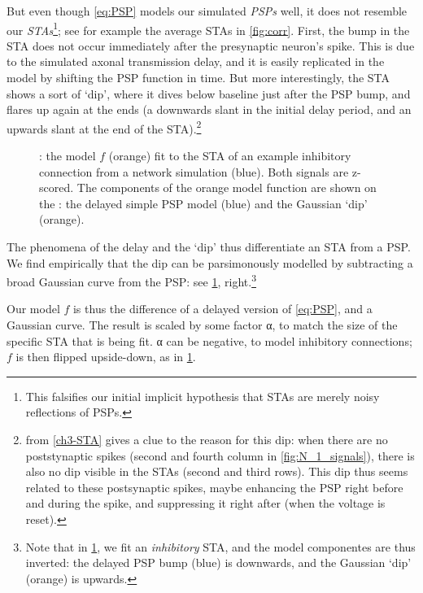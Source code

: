 But even though \cref{eq:PSP} models our simulated \emph{PSPs} well, it does not resemble our \emph{STAs}\footnote{
    This falsifies our initial implicit hypothesis that STAs are merely noisy reflections of PSPs.
};
see for example the average STAs in \cref{fig:corr}.
First, the bump in the STA does not occur immediately after the presynaptic neuron's spike. This is due to the simulated axonal transmission delay, and it is easily replicated in the model by shifting the PSP function in time. But more interestingly, the STA shows a sort of `dip', where it dives below baseline just after the PSP bump, and flares up again at the ends (a downwards slant in the initial delay period, and an upwards slant at the end of the STA).\footnote{
     from \cref{ch3-STA} gives a clue to the reason for this dip: when there are no poststynaptic spikes (second and fourth column in \cref{fig:N_1_signals}), there is also no dip visible in the STAs (second and third rows). This dip thus seems related to these postsynaptic spikes, maybe enhancing the PSP right before and during the spike, and suppressing it right after (when the voltage is reset).
}

\begin{figure}
    {\Left: the model $f$ (orange) fit to the STA of an example inhibitory connection from a network simulation (blue). Both signals are z-scored.
    The components of the orange model function are shown on the
    \Right: the delayed simple PSP model (blue) and  the Gaussian `dip' (orange).}
    \label{fig:modelfit}
\end{figure}

The phenomena of the delay and the `dip' thus differentiate an STA from a PSP. We find empirically that the dip can be parsimonously modelled by subtracting a broad Gaussian curve from the PSP: see \cref{fig:modelfit}, right.\footnote{
    Note that in \cref{fig:modelfit}, we fit an \emph{inhibitory} STA, and the model componentes are thus inverted: the delayed PSP bump (blue) is downwards, and the Gaussian `dip' (orange) is upwards.
}

Our model $f$ is thus the difference of a delayed version of \cref{eq:PSP}, and a  Gaussian curve. The result is scaled by some factor α, to match the size of the specific STA that is being fit. α can be negative, to model inhibitory connections; $f$ is then flipped upside-down, as in \cref{fig:modelfit}.

